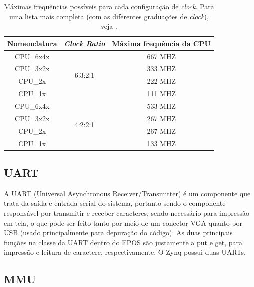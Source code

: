 \begin{table}[ht]
	\centering
	\begin{tabular}{ccc}
		\hline\hline
		Nomenclatura & \emph{Clock Ratio} & Máxima frequência da CPU\\[0.5ex]
		\hline
		CPU\_6x4x & \multirow{4}{*}{6:3:2:1} & 667 MHZ\\
		CPU\_3x2x &                          & 333 MHZ\\
		CPU\_2x   &                          & 222 MHZ\\
		CPU\_1x   &                          & 111 MHZ\\
		\hline
		CPU\_6x4x & \multirow{4}{*}{4:2:2:1} & 533 MHZ\\
		CPU\_3x2x &                          & 267 MHZ\\
		CPU\_2x   &                          & 267 MHZ\\
		CPU\_1x   &                          & 133 MHZ\\[1ex]
		\hline
	\end{tabular}
	\caption{Máximas frequências possíveis para cada configuração de \emph{clock}. Para uma lista mais completa (com as diferentes graduações de \emph{clock}), veja \cite[p.~13]{data_sheet}.}
	\label{tab:clocks}
\end{table}


\subsection{UART}
A UART (Universal Asynchronous Receiver/Transmitter) é um componente que trata da saída e entrada serial do sistema, portanto sendo o componente responsável por transmitir e receber caracteres, sendo necessário para impressão em tela, o que pode ser feito tanto por meio de um conector VGA quanto por USB (usado principalmente para depuração do código). As duas principais funções na classe da UART dentro do EPOS são justamente a put e get, para impressão e leitura de caractere, respectivamente. O Zynq possui duas UARTs.



\subsection{MMU} %

